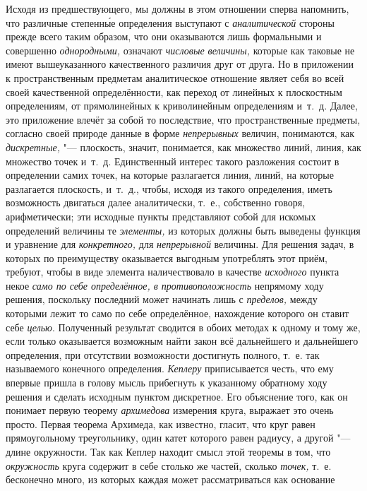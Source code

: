 Исходя из предшествующего, мы должны в этом отношении сперва напомнить, что
различные степенн\'{ы}е определения выступают с {\em аналитической} стороны
прежде всего таким образом, что они оказываются лишь формальными и совершенно
{\em однородными,} означают {\em числовые величины,} которые как таковые не
имеют вышеуказанного качественного различия друг от друга. Но в приложении к
пространственным предметам аналитическое отношение являет себя во всей своей
качественной определённости, как переход от линейных к плоскостным
определениям, от прямолинейных к криволинейным определениям и~т.~д. Далее, это
приложение влечёт за собой то последствие, что пространственные предметы,
согласно своей природе данные в форме {\em непрерывных} величин, понимаются,
как {\em дискретные,} "--- плоскость, значит, понимается, как множество линий,
линия, как множество точек и~т.~д. Единственный интерес такого разложения
состоит в определении самих точек, на которые разлагается линия, линий, на
которые разлагается плоскость, и~т.~д., чтобы, исходя из такого определения,
иметь возможность двигаться далее аналитически, т.~е., собственно говоря,
арифметически; эти исходные пункты представляют собой для искомых определений
величины те {\em элементы,} из которых должны быть выведены функция и уравнение
для {\em конкретного,} для {\em непрерывной} величины. Для решения задач, в
которых по преимуществу оказывается выгодным употреблять этот приём, требуют,
чтобы в виде элемента наличествовало в качестве {\em исходного} пункта некое
{\em само по себе определённое, в противоположность} непрямому ходу
решения, поскольку последний может начинать лишь с {\em пределов,} между
которыми лежит то само по себе определённое, нахождение которого он ставит себе
{\em целью}. Полученный результат сводится в обоих методах к одному и тому же,
если только оказывается возможным найти закон всё дальнейшего и дальнейшего
определения, при отсутствии возможности достигнуть полного, т.~е. так
называемого конечного определения. {\em Кеплеру} приписывается честь, что ему
впервые пришла в голову мысль прибегнуть к указанному обратному ходу решения и
сделать исходным пунктом дискретное. Его объяснение того, как он понимает
первую теорему {\em архимедова} измерения круга, выражает это очень просто.
Первая теорема Архимеда, как известно, гласит, что круг равен прямоугольному
треугольнику, один катет которого равен радиусу, а другой "--- длине
окружности. Так как Кеплер находит смысл этой теоремы в том, что
{\em окружность} круга содержит в себе столько же частей, сколько {\em точек,}
т.~е. бесконечно много, из которых каждая может рассматриваться как основание
